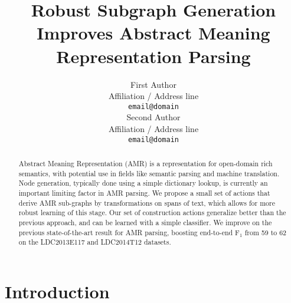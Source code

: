 \documentclass[11pt]{article}
\title{Robust Subgraph Generation Improves Abstract Meaning Representation Parsing}
\author{First Author \\
  Affiliation / Address line \\
  {\tt email@domain} \\\And
  Second Author \\
  Affiliation / Address line \\
  {\tt email@domain} \\}
\date{}
\begin{document}
\maketitle
\begin{abstract}


Abstract Meaning Representation (AMR) is a representation for open-domain rich semantics, with potential use in fields like semantic parsing and machine translation. Node generation, typically done using a simple dictionary lookup, is currently an important limiting factor in AMR parsing. We propose a small set of actions that derive AMR sub-graphs by transformations on spans of text, which allows for more robust learning of this stage. Our set of construction actions generalize better than the previous approach, and can be learned with a simple classifier. We improve on the previous state-of-the-art result for AMR parsing, boosting end-to-end F$_1$ from 59 to 62 on the LDC2013E117 and LDC2014T12 datasets.


\end{abstract}

\section{Introduction}
\end{document}

